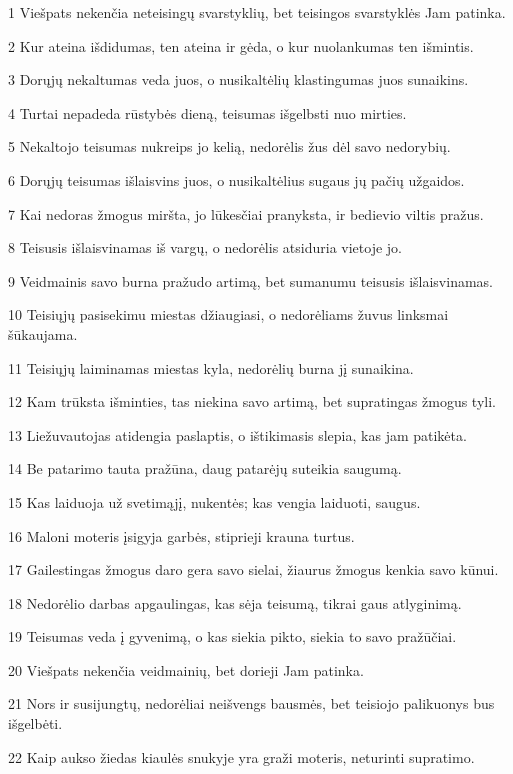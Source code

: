 \par 1 Viešpats nekenčia neteisingų svarstyklių, bet teisingos svarstyklės Jam patinka. 
\par 2 Kur ateina išdidumas, ten ateina ir gėda, o kur nuolankumas­ ten išmintis. 
\par 3 Dorųjų nekaltumas veda juos, o nusikaltėlių klastingumas juos sunaikins. 
\par 4 Turtai nepadeda rūstybės dieną, teisumas išgelbsti nuo mirties. 
\par 5 Nekaltojo teisumas nukreips jo kelią, nedorėlis žus dėl savo nedorybių. 
\par 6 Dorųjų teisumas išlaisvins juos, o nusikaltėlius sugaus jų pačių užgaidos. 
\par 7 Kai nedoras žmogus miršta, jo lūkesčiai pranyksta, ir bedievio viltis pražus. 
\par 8 Teisusis išlaisvinamas iš vargų, o nedorėlis atsiduria vietoje jo. 
\par 9 Veidmainis savo burna pražudo artimą, bet sumanumu teisusis išlaisvinamas. 
\par 10 Teisiųjų pasisekimu miestas džiaugiasi, o nedorėliams žuvus linksmai šūkaujama. 
\par 11 Teisiųjų laiminamas miestas kyla, nedorėlių burna jį sunaikina. 
\par 12 Kam trūksta išminties, tas niekina savo artimą, bet supratingas žmogus tyli. 
\par 13 Liežuvautojas atidengia paslaptis, o ištikimasis slepia, kas jam patikėta. 
\par 14 Be patarimo tauta pražūna, daug patarėjų suteikia saugumą. 
\par 15 Kas laiduoja už svetimąjį, nukentės; kas vengia laiduoti, saugus. 
\par 16 Maloni moteris įsigyja garbės, stiprieji krauna turtus. 
\par 17 Gailestingas žmogus daro gera savo sielai, žiaurus žmogus kenkia savo kūnui. 
\par 18 Nedorėlio darbas apgaulingas, kas sėja teisumą, tikrai gaus atlyginimą. 
\par 19 Teisumas veda į gyvenimą, o kas siekia pikto, siekia to savo pražūčiai. 
\par 20 Viešpats nekenčia veidmainių, bet dorieji Jam patinka. 
\par 21 Nors ir susijungtų, nedorėliai neišvengs bausmės, bet teisiojo palikuonys bus išgelbėti. 
\par 22 Kaip aukso žiedas kiaulės snukyje yra graži moteris, neturinti supratimo. 
